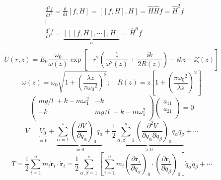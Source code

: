 \documentclass { article }
\begin{document}
\[\begin{split}
& \frac{{{\text{d}}^{2}}f}{\text{d}{{t}^{2}}}=\frac{\text{d}}{\text{d}t}\left[ f,H \right]=\left[ \left[ f,H \right],H \right]=\hat{H}\hat{H}f={{{\hat{H}}}^{2}}f \\ 
& \vdots  \\ 
& \frac{{{\text{d}}^{n}}f}{\text{d}{{t}^{n}}}=\underbrace{\left[ \left[ \left[ f,H \right],\cdots  \right],H \right]}_{n}={{{\hat{H}}}^{n}}f  \\
\end{split}\]
\[\tilde{U}(r,z)=E_0\dfrac{\omega_0}{\omega(z)}\exp\left[-r^2\left(\dfrac{1}{\omega^2(z)}+\dfrac{\ii k}{2R(z)}\right)-\ii k z+\ii \zeta(z)\right]\]
\[\omega(z)=\omega_0\sqrt{1+\left(\dfrac{\lambda z}{\pi {\omega_0}^2}\right)^2};\quad R(z)=z\left[1+\left(\dfrac{\pi {\omega_0}^2}{\lambda z}\right)^2\right]\]
\[\left( \begin{matrix}
{mg}/{l}\;+k-m\omega _{1}^{2} & -k  \\
-k & {mg}/{l}\;+k-m\omega _{1}^{2}  \\
\end{matrix} \right)\left( \begin{matrix}
{{a}_{11}}  \\
{{a}_{21}}  \\
\end{matrix} \right)=0\]
\[V=\underbrace{{{V}_{0}}}_{=0}+\underbrace{\sum\limits_{\alpha =1}^{s}{{{\left( \frac{\partial V}{\partial {{q}_{\alpha }}} \right)}_{0}}{{q}_{\alpha }}}}_{=0}+\underbrace{\frac{1}{2}\sum\limits_{\alpha ,\beta =1}^{s}{{{\left( \frac{{{\partial }^{2}}V}{\partial {{q}_{\alpha }}\partial {{q}_{\beta }}} \right)}_{0}}{{q}_{\alpha }}{{q}_{\beta }}}}_{>0}+\cdots \]
\[T=\frac{1}{2}\sum\limits_{i=1}^{n}{{{m}_{i}}{{{\dot{\bm r}}}_{i}}\cdot {{{\dot{\bm r}}}_{i}}}=\frac{1}{2}\sum\limits_{\alpha ,\beta =1}^{s}{\left[ \sum\limits_{i=1}^{n}{{{m}_{i}}{{\left( \frac{\partial {{\bm r}_{i}}}{\partial {{q}_{\alpha }}} \right)}_{0}}\cdot {{\left( \frac{\partial {{\bm r}_{i}}}{\partial {{q}_{\beta }}} \right)}_{0}}} \right]{{{\dot{q}}}_{\alpha }}{{{\dot{q}}}_{\beta }}}+\cdots \]
\end{document}
